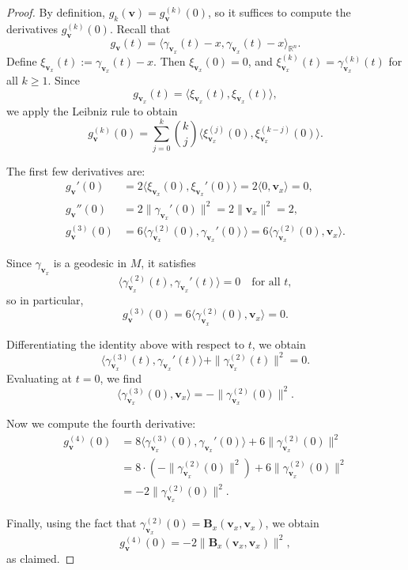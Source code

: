 \documentclass[10pt,a4paper]{amsart}
\newcommand{\mf}[1]{\mathbf{#1}}
\begin{document}
\begin{proof}
By definition, \( g_k(\mathbf{v}) = g_{\mathbf{v}}^{(k)}(0) \), so it suffices to compute the derivatives \( g_{\mathbf{v}}^{(k)}(0) \). Recall that
\[
g_{\mathbf{v}}(t) = \langle \gamma_{\mathbf{v}_{x}}(t) - x, \gamma_{\mathbf{v}_{x}}(t) - x \rangle_{\mathbb{R}^n}.
\]
Define \( \xi_{\mathbf{v}_{x}}(t) := \gamma_{\mathbf{v}_{x}}(t) - x \). Then \( \xi_{\mathbf{v}_{x}}(0) = 0 \), and \( \xi_{\mathbf{v}_{x}}^{(k)}(t) = \gamma_{\mathbf{v}_{x}}^{(k)}(t) \) for all \( k \geq 1 \). Since
\[
g_{\mathbf{v}_{x}}(t) = \langle \xi_{\mathbf{v}_{x}}(t), \xi_{\mathbf{v}_{x}}(t) \rangle,
\]
we apply the Leibniz rule to obtain
\[
g_{\mathbf{v}}^{(k)}(0) = \sum_{j=0}^{k} \binom{k}{j} \langle \xi_{\mathbf{v}_{x}}^{(j)}(0), \xi_{\mathbf{v}_{x}}^{(k-j)}(0) \rangle.
\]

The first few derivatives are:
\begin{align*}
g_{\mathbf{v}}'(0) &= 2 \langle \xi_{\mathbf{v}_{x}}(0), \xi_{\mathbf{v}_{x}}'(0) \rangle = 2 \langle 0, \mathbf{v}_{x} \rangle = 0, \\
g_{\mathbf{v}}''(0) &= 2 \| \gamma_{\mathbf{v}_{x}}'(0) \|^2 = 2 \| \mathbf{v}_{x} \|^2 = 2, \\
g_{\mathbf{v}}^{(3)}(0) &= 6 \langle \gamma_{\mathbf{v}_{x}}^{(2)}(0), \gamma_{\mathbf{v}_{x}}'(0) \rangle = 6 \langle \gamma_{\mathbf{v}_{x}}^{(2)}(0), \mathbf{v}_{x} \rangle.
\end{align*}

Since \( \gamma_{\mathbf{v}_{x}} \) is a geodesic in \( M \), it satisfies
\[
\langle \gamma_{\mathbf{v}_{x}}^{(2)}(t), \gamma_{\mathbf{v}_{x}}'(t) \rangle = 0 \quad \text{for all } t,
\]
so in particular,
\[
g_{\mathbf{v}}^{(3)}(0) = 6 \langle \gamma_{\mathbf{v}_{x}}^{(2)}(0), \mathbf{v}_{x} \rangle = 0.
\]

Differentiating the identity above with respect to \( t \), we obtain
\[
\langle \gamma_{\mathbf{v}_{x}}^{(3)}(t), \gamma_{\mathbf{v}_{x}}'(t) \rangle + \| \gamma_{\mathbf{v}_{x}}^{(2)}(t) \|^2 = 0.
\]
Evaluating at \( t = 0 \), we find
\[
\langle \gamma_{\mathbf{v}_{x}}^{(3)}(0), \mathbf{v}_{x} \rangle = - \| \gamma_{\mathbf{v}_{x}}^{(2)}(0) \|^2.
\]

Now we compute the fourth derivative:
\begin{align*}
g_{\mathbf{v}}^{(4)}(0)
&= 8 \langle \gamma_{\mathbf{v}_{x}}^{(3)}(0), \gamma_{\mathbf{v}_{x}}'(0) \rangle + 6 \| \gamma_{\mathbf{v}_{x}}^{(2)}(0) \|^2 \\
&= 8 \cdot \left( - \| \gamma_{\mathbf{v}_{x}}^{(2)}(0) \|^2 \right) + 6 \| \gamma_{\mathbf{v}_{x}}^{(2)}(0) \|^2 \\
&= -2 \| \gamma_{\mathbf{v}_{x}}^{(2)}(0) \|^2.
\end{align*}

Finally, using the fact that \( \gamma_{\mathbf{v}_{x}}^{(2)}(0) =\mf B_x(\mathbf{v}_{x}, \mathbf{v}_{x}) \), we obtain
\[
g_{\mathbf{v}}^{(4)}(0) = -2 \|\mf B_x(\mathbf{v}_{x}, \mathbf{v}_{x}) \|^2,
\]
as claimed.
\end{proof}
\end{document}
